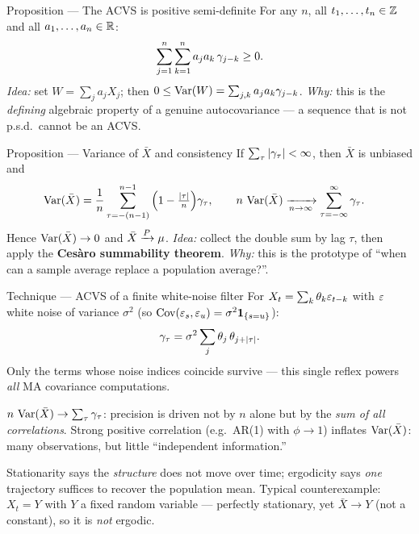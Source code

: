 \documentclass[11pt]{article}
\begin{document}
\begin{result}{Proposition --- The ACVS is positive semi-definite}
For any $n$, all $t_1,\dots,t_n\in\mathbb{Z}$ and all $a_1,\dots,a_n\in\mathbb{R}$:
\[
\sum_{j=1}^n\sum_{k=1}^n a_ja_k\,\gamma_{j-k}\ge 0 .
\]
\textit{Idea:} set $W=\sum_j a_jX_j$; then $0\le\operatorname{Var}(W)=\sum_{j,k}a_ja_k\gamma_{j-k}$. \textit{Why:} this is the \emph{defining} algebraic property of a genuine autocovariance --- a sequence that is not p.s.d.\ cannot be an ACVS.
\end{result}

\begin{result}{Proposition --- Variance of $\bar X$ and consistency}
If $\sum_\tau\left\lvert \gamma_\tau \right\rvert<\infty$, then $\bar X$ is unbiased and
\[
\begin{aligned}
\operatorname{Var}(\bar X)&=\frac1{n}\sum_{\tau=-(n-1)}^{n-1}\Big(1-\tfrac{\left\lvert \tau \right\rvert}{n}\Big)\gamma_\tau,
\qquad
n\,\operatorname{Var}(\bar X)\xrightarrow[n\to\infty]{}\sum_{\tau=-\infty}^{\infty}\gamma_\tau .
\end{aligned}
\]
Hence $\operatorname{Var}(\bar X)\to 0$ and $\bar X\xrightarrow{P}\mu$. \textit{Idea:} collect the double sum by lag $\tau$, then apply the \textbf{Ces\`aro summability theorem}. \textit{Why:} this is the prototype of ``when can a sample average replace a population average?''.
\end{result}

\begin{result}{Technique --- ACVS of a finite white-noise filter}
For $X_t=\sum_k\theta_k\varepsilon_{t-k}$ with $\varepsilon$ white noise of variance $\sigma^2$ (so $\operatorname{Cov}(\varepsilon_s,\varepsilon_u)=\sigma^2\mathbf{1}_{\{s=u\}}$):
\[
\gamma_\tau=\sigma^2\sum_{j}\theta_j\,\theta_{j+\left\lvert \tau \right\rvert}.
\]
Only the terms whose noise indices coincide survive --- this single reflex powers \emph{all} MA covariance computations.
\end{result}

\begin{intu}
$n\,\operatorname{Var}(\bar X)\to\sum_\tau\gamma_\tau$: precision is driven not by $n$ alone but by the \emph{sum of all correlations}. Strong positive correlation (e.g.\ AR(1) with $\phi\to1$) inflates $\operatorname{Var}(\bar X)$: many observations, but little ``independent information.''
\end{intu}

\begin{intu}
Stationarity says the \emph{structure} does not move over time; ergodicity says \emph{one} trajectory suffices to recover the population mean. Typical counterexample: $X_t=Y$ with $Y$ a fixed random variable --- perfectly stationary, yet $\bar X\to Y$ (not a constant), so it is \emph{not} ergodic.
\end{intu}
\end{document}
